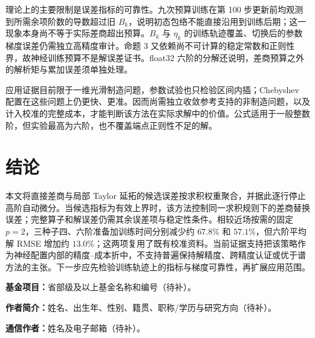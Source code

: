 \documentclass[UTF8,fontset=none,10.5pt,a4paper]{ctexart}
\numberwithin{equation}{section}
\begin{document}
理论上的主要限制是误差指标的可靠性。九次预算训练在第 100 步更新前均观测到所需余项阶数的导数超过旧 $B_k$，说明初态包络不能直接沿用到训练后期；这一现象本身尚不等于实际差商超出预算。$B_k$ 与 $\eta_k$ 的训练轨迹覆盖、切换后的参数梯度误差仍需独立高精度审计。命题 3 又依赖尚不可计算的稳定常数和正则性界，故神经训练预算不是解误差证书。float32 六阶的分解还说明，差商预算之外的解析矩与累加误差须单独处理。

应用证据目前限于一维光滑制造问题，参数试验也只检验区间内插；Chebyshev 配置在这些问题上仍更快、更准。因而尚需独立收敛参考支持的非制造问题，以及计入校准的完整成本，才能判断该方法在实际求解中的价值。公式适用于一般整数阶，但实验最高为六阶，也不覆盖端点正则性不足的解。

\section{结论}

本文将直接差商与局部 Taylor 延拓的候选误差按求积权重聚合，并据此逐行停止高阶自动微分。当候选指标为有效上界时，该方法控制同一求积规则下的差商替换误差；完整算子和解误差仍需其余误差项与稳定性条件。相较近场按需的固定 $p=2$，三种子四、六阶准备加训练时间分别减少约 $67.8\%$ 和 $57.1\%$，但六阶平均解 RMSE 增加约 $13.0\%$；这两项复用了既有校准资料。当前证据支持把该策略作为神经配置内部的精度--成本折中，不支持普遍保持解精度、跨精度认证或优于谱方法的主张。下一步应先检验训练轨迹上的指标与梯度可靠性，再扩展应用范围。

\vspace{0.5em}
\noindent\textbf{基金项目：}省部级及以上基金名称和编号（待补）。

\noindent\textbf{作者简介：}姓名、出生年、性别、籍贯、职称/学历与研究方向（待补）。

\noindent\textbf{通信作者：}姓名及电子邮箱（待补）。
\end{document}
